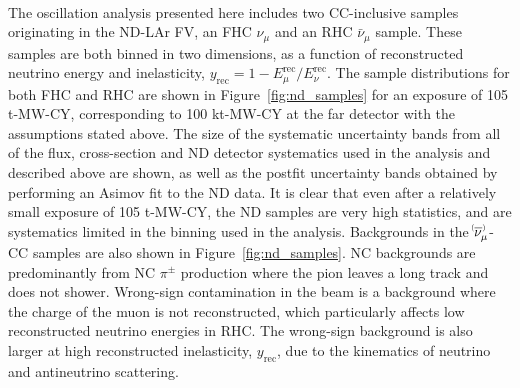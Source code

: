 \begin{figure*}
  \centering
  \\
  \caption{ND samples in both FHC and RHC, shown in the reconstructed neutrino energy and reconstructed inelasticity binning ($y_{\mathrm{rec}}$) used in the analysis, for a 105 t-MW-CY exposure (equivalent to a 100 kt-MW-CY exposure at the FD) with all relevant exposure assumptions including 57\% accelerator uptime as described in the text, with an equal split between FHC and RHC. The size of the systematic uncertainty bands from all of the flux, cross-section and ND detector systematics used in the analysis are shown, as well as the postfit uncertainty bands obtained by performing an Asimov fit to the ND data. NC backgrounds and wrong-sign contributions to the total event rate are also shown. Statistical uncertainties are too small to be visible on this plot scale.}
 \label{fig:nd_samples}
\end{figure*}
The oscillation analysis presented here includes two CC-inclusive samples originating in the ND-LAr FV, an FHC $\nu_{\mu}$ and an RHC $\bar{\nu}_{\mu}$ sample. These samples are both binned in two dimensions, as a function of reconstructed neutrino energy and inelasticity, $y_{\mathrm{rec}} = 1 - E^{\mathrm{rec}}_{\mu}/E^{\mathrm{rec}}_{\nu}$. The sample distributions for both FHC and RHC are shown in Figure~\ref{fig:nd_samples} for an exposure of 105 t-MW-CY, corresponding to 100 kt-MW-CY at the far detector with the assumptions stated above. The size of the systematic uncertainty bands from all of the flux, cross-section and ND detector systematics used in the analysis and described above are shown, as well as the postfit uncertainty bands obtained by performing an Asimov fit to the ND data. It is clear that even after a relatively small exposure of 105 t-MW-CY, the ND samples are very high statistics, and are systematics limited in the binning used in the analysis. Backgrounds in the $\nu^{\bracketbar}_{\mu}$-CC samples are also shown in Figure~\ref{fig:nd_samples}. NC backgrounds are predominantly from NC $\pi^{\pm}$ production where the pion leaves a long track and does not shower. Wrong-sign contamination in the beam is a background where the charge of the muon is not reconstructed, which particularly affects low reconstructed neutrino energies in RHC. The wrong-sign background is also larger at high reconstructed inelasticity, $y_{\mathrm{rec}}$, due to the kinematics of neutrino and antineutrino scattering.

